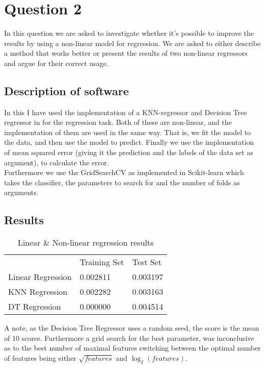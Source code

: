 \section{Question 2}
In this question we are asked to investigate whether it's possible to improve the results by using a non-linear model for regression. We are asked to either describe a method that works better or present the results of two non-linear regressors and argue for their correct usage.

\subsection{Description of software}
In this I have used the implementation of a KNN-regressor and Decision Tree regressor in \cite{scikit-learn} for the regression task. Both of these are non-linear, and the implementation of them are used in the same way. That is, we fit the model to the data, and then use the model to predict. Finally we use the \cite{scikit-learn} implementation of mean squared error (giving it the prediction and the labels of the data set as argument), to calculate the error.\\
Furthermore we use the GridSearchCV as implemented in Scikit-learn \citep{scikit-learn} which takes the classifier, the parameters to search for and the number of folds as arguments.

\subsection{Results}
\begin{table}[h]
  \centering
  \begin{tabular}{lll}
    & Training Set & Test Set \\
    Linear Regression & 0.002811 & 0.003197 \\
    KNN Regression & 0.002282 & 0.003163 \\
    DT Regression & 0.000000 & 0.004514
  \end{tabular}
 \caption{Linear \& Non-linear regression results}
 \label{nonlinRegression}
\end{table}

A note, as the Decision Tree Regressor uses a random seed, the score is the mean of 10 scores. Furthermore a grid search for the best parameter, was inconclusive as to the best number of maximal features switching between the optimal number of features being either \(\sqrt{features}\) and \(\log_2(features)\).


